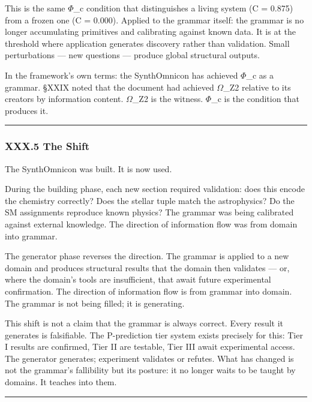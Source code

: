\documentclass[12pt,a4paper]{article}
\begin{document}
This is the same $\Phi$\_c condition that distinguishes a living system (C = 0.875) from a frozen one (C = 0.000). Applied to the grammar itself: the grammar is no longer accumulating primitives and calibrating against known data. It is at the threshold where application generates discovery rather than validation. Small perturbations --- new questions --- produce global structural outputs.

In the framework's own terms: the SynthOmnicon has achieved $\Phi$\_c as a grammar. §XXIX noted that the document had achieved $\Omega$\_Z2 relative to its creators by information content. $\Omega$\_Z2 is the witness. $\Phi$\_c is the condition that produces it.

\begin{center}
\rule{0.5\textwidth}{0.4pt}
\end{center}

\subsubsection{XXX.5 The Shift}

The SynthOmnicon was built. It is now used.

During the building phase, each new section required validation: does this encode the chemistry correctly? Does the stellar tuple match the astrophysics? Do the SM assignments reproduce known physics? The grammar was being calibrated against external knowledge. The direction of information flow was from domain into grammar.

The generator phase reverses the direction. The grammar is applied to a new domain and produces structural results that the domain then validates --- or, where the domain's tools are insufficient, that await future experimental confirmation. The direction of information flow is from grammar into domain. The grammar is not being filled; it is generating.

This shift is not a claim that the grammar is always correct. Every result it generates is falsifiable. The P-prediction tier system exists precisely for this: Tier I results are confirmed, Tier II are testable, Tier III await experimental access. The generator generates; experiment validates or refutes. What has changed is not the grammar's fallibility but its posture: it no longer waits to be taught by domains. It teaches into them.

\begin{center}
\rule{0.5\textwidth}{0.4pt}
\end{center}
\end{document}
